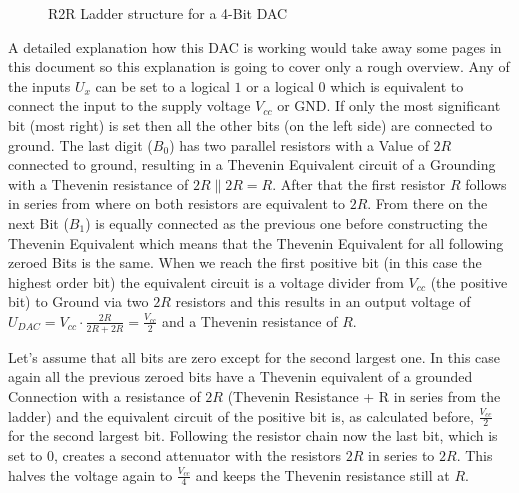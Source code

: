 \begin{figure}[htb]
	\centering
	\caption{R2R Ladder structure for a 4-Bit DAC}
	\label{fig:r2r-ladder}
\end{figure}

A detailed explanation how this DAC is working would take away some pages in this document so this explanation is going to cover only a rough overview. Any of the inputs $U_x$ can be set to a logical $1$ or a logical $0$ which is equivalent to connect the input to the supply voltage $V_{cc}$ or GND. If only the most significant bit (most right) is set then all the other bits (on the left side) are connected to ground. The last digit ($B_0$) has two parallel resistors with a Value of $2R$ connected to ground, resulting in a Thevenin Equivalent circuit of a Grounding with a Thevenin resistance of $2R \parallel 2R = R$. After that the first resistor $R$ follows in series from where on both resistors are equivalent to $2R$. From there on the next Bit ($B_1$) is equally connected as the previous one before constructing the Thevenin Equivalent which means that the Thevenin Equivalent for all following zeroed Bits is the same. When we reach the first positive bit (in this case the highest order bit) the equivalent circuit is a voltage divider from $V_{cc}$ (the positive bit) to Ground via two $2R$ resistors and this results in an output voltage of $U_{DAC} = V_{cc} \cdot \frac{2R}{2R + 2R} = \frac{V_{cc}}{2}$ and a Thevenin resistance of $R$.

Let's assume that all bits are zero except for the second largest one. In this case again all the previous zeroed bits have a Thevenin equivalent of a grounded Connection with a resistance of $2R$ (Thevenin Resistance + R in series from the ladder) and the equivalent circuit of the positive bit is, as calculated before, $\frac{V_{cc}}{2}$ for the second largest bit. Following the resistor chain now the last bit, which is set to $0$, creates a second attenuator with the resistors $2R$ in series to $2R$. This halves the voltage again to $\frac{V_{cc}}{4}$ and keeps the Thevenin resistance still at $R$.

